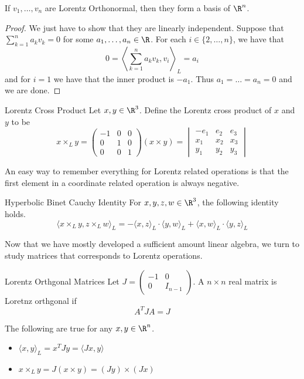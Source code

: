 \begin{lmm}{}{} If $v_1,\dots,v_n$ are Lorentz Orthonormal, then they form a basis of $\R^n$. \tcbline
\begin{proof}
We just have to show that they are linearly independent. Suppose that $\sum_{k=1}^na_kv_k=0$ for some $a_1,\dots,a_n\in\R$. For each $i\in\{2,\dots,n\}$, we have that $$0=\left\langle\sum_{k=1}^na_kv_k,v_i\right\rangle_L=a_i$$ and for $i=1$ we have that the inner product is $-a_1$. Thus $a_1=\dots=a_n=0$ and we are done. 
\end{proof}
\end{lmm}

\begin{defn}{Lorentz Cross Product}{} Let $x,y\in\R^3$. Define the Lorentz cross product of $x$ and $y$ to be $$x\times_L y=\begin{pmatrix}
-1 & 0 & 0\\
0 & 1 & 0\\
0 & 0 & 1
\end{pmatrix}(x\times y)=\begin{vmatrix}
-e_1 & e_2 & e_3\\
x_1 & x_2 & x_3\\
y_1 & y_2 & y_3
\end{vmatrix}$$
\end{defn}

An easy way to remember everything for Lorentz related operations is that the first element in a coordinate related operation is always negative. 

\begin{lmm}{Hyperbolic Binet Cauchy Identity}{} For $x,y,z,w\in\R^3$, the following identity holds. $$\langle x\times_Ly,z\times_L w\rangle_L=-\langle x,z\rangle_L\cdot\langle y,w\rangle_L+\langle x,w\rangle_L\cdot\langle y,z\rangle_L$$
\end{lmm}

Now that we have mostly developed a sufficient amount linear algebra, we turn to study matrices that corresponds to Lorentz operations. 

\begin{defn}{Lorentz Orthgonal Matrices}{} Let $J=\begin{pmatrix}-1&0\\0&I_{n-1}\end{pmatrix}$. A $n\times n$ real matrix is Loretnz orthgonal if $$A^TJA=J$$
\end{defn}

\begin{prp}{}{} The following are true for any $x,y\in\R^n$. 
\begin{itemize}
\item $\langle x,y\rangle_L=x^TJy=\langle Jx,y\rangle$
\item $x\times_Ly=J(x\times y)=(Jy)\times(Jx)$
\end{itemize}
\end{prp}

